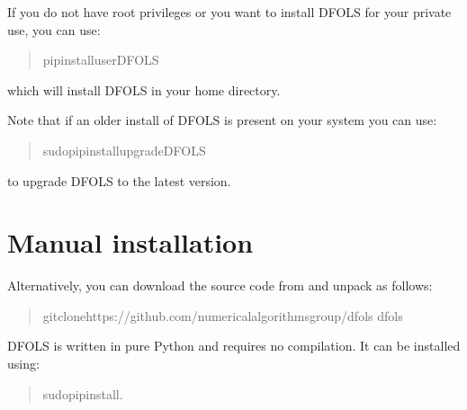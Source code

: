 \documentclass[letterpaper,10pt,english]{sphinxmanual}
\begin{document}
\sphinxAtStartPar
If you do not have root privileges or you want to install DFO\sphinxhyphen{}LS for your private use, you can use:
\begin{quote}

\begin{sphinxVerbatim}[commandchars=\\\{\}]
\PYGZdl{}pipinstall\PYGZhy{}\PYGZhy{}userDFO\PYGZhy{}LS
\end{sphinxVerbatim}
\end{quote}

\sphinxAtStartPar
which will install DFO\sphinxhyphen{}LS in your home directory.

\sphinxAtStartPar
Note that if an older install of DFO\sphinxhyphen{}LS is present on your system you can use:
\begin{quote}

\begin{sphinxVerbatim}[commandchars=\\\{\}]
\PYGZdl{}\PYG{o}{[}sudo\PYG{o}{]}pipinstall\PYGZhy{}\PYGZhy{}upgradeDFO\PYGZhy{}LS
\end{sphinxVerbatim}
\end{quote}

\sphinxAtStartPar
to upgrade DFO\sphinxhyphen{}LS to the latest version.


\section{Manual installation}
\label{\detokenize{install:manual-installation}}
\sphinxAtStartPar
Alternatively, you can download the source code from  and unpack as follows:
\begin{quote}

\begin{sphinxVerbatim}[commandchars=\\\{\}]
\PYGZdl{}gitclonehttps://github.com/numericalalgorithmsgroup/dfols
\PYGZdl{}dfols
\end{sphinxVerbatim}
\end{quote}

\sphinxAtStartPar
DFO\sphinxhyphen{}LS is written in pure Python and requires no compilation. It can be installed using:
\begin{quote}

\begin{sphinxVerbatim}[commandchars=\\\{\}]
\PYGZdl{}\PYG{o}{[}sudo\PYG{o}{]}pipinstall.
\end{sphinxVerbatim}
\end{quote}
\end{document}
